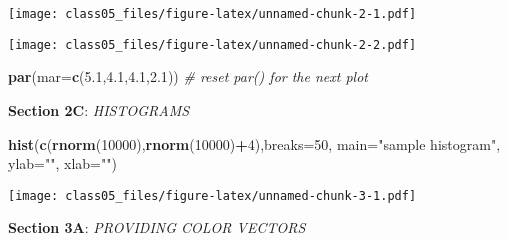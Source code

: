 \documentclass[]{article}
\newenvironment{Shaded}{\begin{snugshade}}{\end{snugshade}}
\newcommand{\KeywordTok}[1]{\textcolor[rgb]{0.13,0.29,0.53}{\textbf{#1}}}
\newcommand{\DataTypeTok}[1]{\textcolor[rgb]{0.13,0.29,0.53}{#1}}
\newcommand{\DecValTok}[1]{\textcolor[rgb]{0.00,0.00,0.81}{#1}}
\newcommand{\FloatTok}[1]{\textcolor[rgb]{0.00,0.00,0.81}{#1}}
\newcommand{\StringTok}[1]{\textcolor[rgb]{0.31,0.60,0.02}{#1}}
\newcommand{\CommentTok}[1]{\textcolor[rgb]{0.56,0.35,0.01}{\textit{#1}}}
\newcommand{\OtherTok}[1]{\textcolor[rgb]{0.56,0.35,0.01}{#1}}
\newcommand{\OperatorTok}[1]{\textcolor[rgb]{0.81,0.36,0.00}{\textbf{#1}}}
\newcommand{\NormalTok}[1]{#1}
\begin{document}
\texttt{[image: class05\_files/figure-latex/unnamed-chunk-2-1.pdf]}

\begin{Shaded}
\end{Shaded}

\texttt{[image: class05\_files/figure-latex/unnamed-chunk-2-2.pdf]}

\begin{Shaded}
\begin{Highlighting}[]
\KeywordTok{par}\NormalTok{(}\DataTypeTok{mar=}\KeywordTok{c}\NormalTok{(}\FloatTok{5.1}\NormalTok{,}\FloatTok{4.1}\NormalTok{,}\FloatTok{4.1}\NormalTok{,}\FloatTok{2.1}\NormalTok{))  }\CommentTok{# reset par() for the next plot}
\end{Highlighting}
\end{Shaded}

\textbf{Section 2C}: \emph{HISTOGRAMS}

\begin{Shaded}
\begin{Highlighting}[]
\KeywordTok{hist}\NormalTok{(}\KeywordTok{c}\NormalTok{(}\KeywordTok{rnorm}\NormalTok{(}\DecValTok{10000}\NormalTok{),}\KeywordTok{rnorm}\NormalTok{(}\DecValTok{10000}\NormalTok{)}\OperatorTok{+}\DecValTok{4}\NormalTok{),}\DataTypeTok{breaks=}\DecValTok{50}\NormalTok{, }\DataTypeTok{main=}\StringTok{"sample histogram"}\NormalTok{, }\DataTypeTok{ylab=}\StringTok{""}\NormalTok{, }\DataTypeTok{xlab=}\StringTok{""}\NormalTok{)}
\end{Highlighting}
\end{Shaded}

\texttt{[image: class05\_files/figure-latex/unnamed-chunk-3-1.pdf]}

\textbf{Section 3A}: \emph{PROVIDING COLOR VECTORS}
\end{document}
